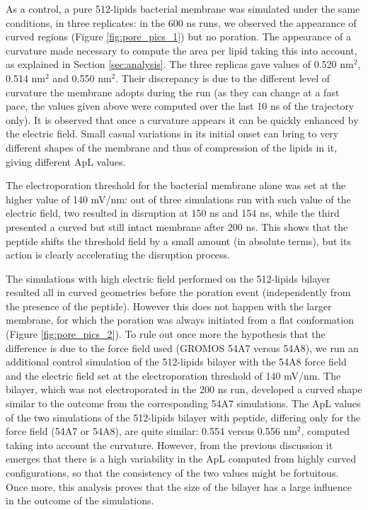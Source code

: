 As a control, a pure 512-lipids bacterial membrane was simulated under the same conditions, in three replicates: in the 600 ns runs, we observed the appearance of curved regions (Figure \ref{fig:pore_pics_1}) but no poration.
%
The appearance of a curvature made necessary to compute the area per lipid taking this into account, as explained in Section \ref{sec:analysis}. The three replicas gave values of 0.520 nm$^2$, 0.514 nm$^2$ and 0.550 nm$^2$. Their discrepancy is due to the different level of curvature the membrane adopts during the run (as they can change at a fast pace, the values given above were computed over the last 10 ns of the trajectory only).
%
It is observed that once a curvature appears it can be quickly enhanced by the electric field. Small casual variations in its initial onset can bring to very different shapes of the membrane and thus of compression of the lipids in it, giving different ApL values.

The electroporation threshold for the bacterial membrane alone was set at the higher value of 140 mV/nm: out of three simulations run with such value of the electric field, two resulted in disruption at 150 ns and 154 ns, while the third presented a curved but still intact membrane after 200 ns.
%
This shows that the peptide shifts the threshold field by a small amount (in absolute terms), but its action is clearly accelerating the disruption process.

The simulations with high electric field performed on the 512-lipids bilayer resulted all in curved geometries before the poration event (independently from the presence of the peptide). However this does not happen with the larger membrane, for which the poration was always initiated from a flat conformation (Figure \ref{fig:pore_pics_2}).
%
To rule out once more the hypothesis that the difference is due to the force field used (GROMOS 54A7 versus 54A8), we run an additional control simulation of the 512-lipids bilayer with the 54A8 force field and the electric field set at the electroporation threshold of 140 mV/nm. The bilayer, which was not electroporated in the 200 ns run, developed a curved shape similar to the outcome from the corresponding 54A7 simulations.
%
The ApL values of the two simulations of the 512-lipids bilayer with peptide, differing only for the force field (54A7 or 54A8), are quite similar: 0.554 versus 0.556 nm$^2$, computed taking into account the curvature.
%
However, from the previous discussion it emerges that there is a high variability in the ApL computed from highly curved configurations, so that the consistency of the two values might be fortuitous.
%
Once more, this analysis proves that the size of the bilayer has a large influence in the outcome of the simulations.

